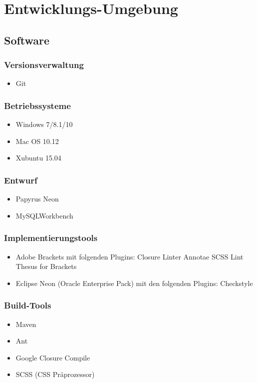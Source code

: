 \section{Entwicklungs-Umgebung}
\subsection{Software}
	\subsubsection{Versionsverwaltung}
		\begin{itemize}
			\item Git
		\end{itemize}
	\subsubsection{Betriebssysteme}
		\begin{itemize}
			\item Windows 7/8.1/10
			\item Mac OS 10.12
			\item Xubuntu 15.04
		\end{itemize}
	\subsubsection{Entwurf}
		\begin{itemize}
			\item Papyrus Neon
			\item MySQLWorkbench
		\end{itemize}
	\subsubsection{Implementierungstools}
		\begin{itemize}
			\item Adobe Brackets mit folgenden Plugins:
				\subitem Closure Linter
				\subitem Annotae
				\subitem SCSS Lint
				\subitem Thesus for Brackets
			\item Eclipse Neon (Oracle Enterprise Pack) mit den folgenden Plugins:
				\subitem Checkstyle
		\end{itemize}
	\subsubsection{Build-Tools}
		\begin{itemize}
			\item Maven
			\item Ant
			\item Google Closure Compile
			\item SCSS (CSS Präprozessor)
		\end{itemize}
